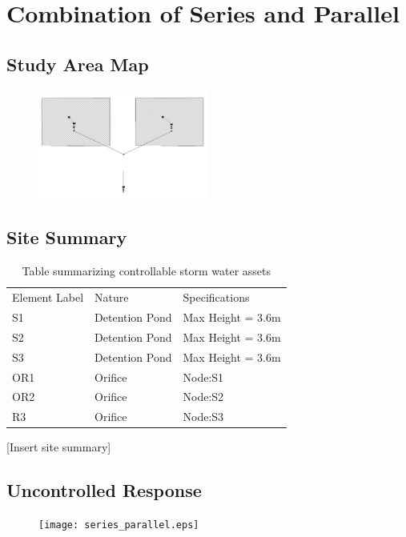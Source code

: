 \documentclass{article}
\begin{document}
\section{Combination of Series and Parallel}

\subsection{Study Area Map}

\begin{figure}[H]
  \centering
  \includegraphics[width = 0.5\textwidth]{Sriesp.JPG}
\end{figure}

\subsection{Site Summary}
\begin{table}[H]
\centering
\label{my-label}
\begin{tabular}{lll}
Element Label & Nature         & Specifications   \\
S1            & Detention Pond & Max Height = 3.6m  \\
  S2            & Detention Pond & Max Height = 3.6m  \\
  S3            & Detention Pond & Max Height = 3.6m  \\
    OR1 & Orifice & Node:S1\\
  OR2 & Orifice & Node:S2 \\
    R3 & Orifice & Node:S3
\end{tabular}
\caption{Table summarizing controllable storm water assets}
\end{table}
[Insert site summary]
\subsection{Uncontrolled Response}
\begin{figure}[H]
  \centering
  \texttt{[image: series\_parallel.eps]}
\end{figure}
\end{document}
